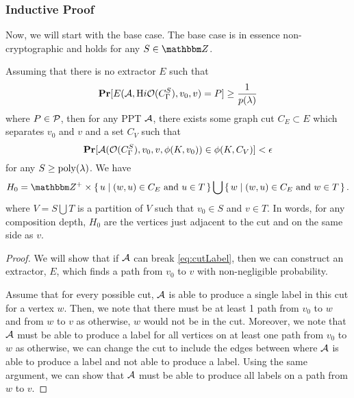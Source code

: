 \subsubsection*{Inductive Proof}
Now, we will start with the base case. The base case is in essence non-cryptographic and holds for any $S \in \Z$.
\begin{lemma}
	\label{lemma:cutBaseCase}
	Assuming that there is no extractor $E$ such that 
	$$\operatorname*{\mathbf{Pr}}[E(\mathcal{A},\text{H}i\mathcal{O}({C_\Gamma^S}), v_0, v) = P] \geq \frac{1}{p(\lambda)}$$
	where $P \in \mathcal{P}$, then for any PPT $\mathcal{A}$, there exists some graph cut
	$C_E \subset E$ which separates $v_0$ and $v$ and a set $C_V$ such that
	\begin{equation}
		\label{eq:cutLabel}
		\operatorname*{\mathbf{Pr}}[\mathcal{A}(\mathcal{O}({C_\Gamma^S}), v_0, v, \phi(K, v_0)) \in \phi(K, C_V)] < \epsilon
	\end{equation}
	for any $S \geq \operatorname{poly}(\lambda)$.
	We have
	\begin{equation*}
		H_0 = \Z^+ \times \set{ u \mid (w, u) \in C_E \text{ and } u \in T} \bigcup \set{ w \mid (w, u) \in C_E \text{ and } w \in T}.
	\end{equation*}
	where $V = S \bigcup T$ is a partition of $V$ such that $v_0 \in S$ and $v \in T$.
	In words, for any composition depth, $H_0$ are the vertices just adjacent to the cut and on the same side as $v$.
	\begin{proof}
		We will show that if $\mathcal{A}$ can break \cref{eq:cutLabel}, then we can construct an extractor,
		$E$, which finds a path from $v_0$ to $v$ with non-negligible probability.

		Assume that for every possible cut, $\mathcal{A}$ is able to produce a single label in this cut for a vertex $w$.
		Then, we note that there must be at least 1 path from $v_0$ to $w$ and from $w$ to $v$ as otherwise, $w$ would not be in the cut.
		Moreover, we note that $\mathcal{A}$ must be able to produce a label for all vertices on at least one path
		from $v_0$ to $w$ as otherwise, we can change the cut to include the edges between where
		$\mathcal{A}$ is able to produce a label and not able to produce a label. Using the same argument,
		we can show that $\mathcal{A}$ must be able to produce all labels on a path from $w$ to $v$.


\end{proof}
\end{lemma}
